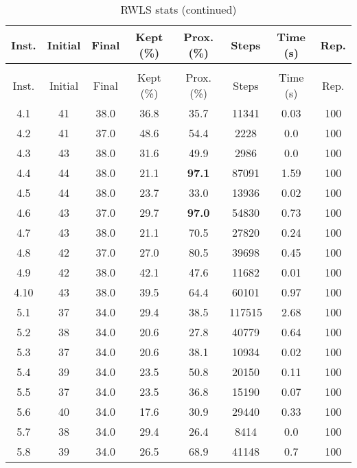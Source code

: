 \begin{longtable}{@{\extracolsep{5pt}}cccccccc}
	\caption{RWLS stats}\\
	\toprule
	Inst. & Initial & Final & Kept (\%) & Prox. (\%) & Steps & Time (s) & Rep.\\
	\midrule
	\endfirsthead
	\caption[]{RWLS stats (continued)}\\
	\toprule
	Inst. & Initial & Final & Kept (\%) & Prox. (\%) & Steps & Time (s) & Rep.\\
	\midrule
	\endhead
	\bottomrule
	\endfoot
	4.1 &
		41 & 38.0 &
			36.8
		&
			35.7
		& 11341 & 0.03 & 100
	\\
	4.2 &
		41 & 37.0 &
			48.6
		&
			54.4
		& 2228 & 0.0 & 100
	\\
	4.3 &
		43 & 38.0 &
			31.6
		&
			49.9
		& 2986 & 0.0 & 100
	\\
	4.4 &
		44 & 38.0 &
			21.1
		&
			\textbf{97.1}
		& 87091 & 1.59 & 100
	\\
	4.5 &
		44 & 38.0 &
			23.7
		&
			33.0
		& 13936 & 0.02 & 100
	\\
	4.6 &
		43 & 37.0 &
			29.7
		&
			\textbf{97.0}
		& 54830 & 0.73 & 100
	\\
	4.7 &
		43 & 38.0 &
			21.1
		&
			70.5
		& 27820 & 0.24 & 100
	\\
	4.8 &
		42 & 37.0 &
			27.0
		&
			80.5
		& 39698 & 0.45 & 100
	\\
	4.9 &
		42 & 38.0 &
			42.1
		&
			47.6
		& 11682 & 0.01 & 100
	\\
	4.10 &
		43 & 38.0 &
			39.5
		&
			64.4
		& 60101 & 0.97 & 100
	\\
	5.1 &
		37 & 34.0 &
			29.4
		&
			38.5
		& 117515 & 2.68 & 100
	\\
	5.2 &
		38 & 34.0 &
			20.6
		&
			27.8
		& 40779 & 0.64 & 100
	\\
	5.3 &
		37 & 34.0 &
			20.6
		&
			38.1
		& 10934 & 0.02 & 100
	\\
	5.4 &
		39 & 34.0 &
			23.5
		&
			50.8
		& 20150 & 0.11 & 100
	\\
	5.5 &
		37 & 34.0 &
			23.5
		&
			36.8
		& 15190 & 0.07 & 100
	\\
	5.6 &
		40 & 34.0 &
			17.6
		&
			30.9
		& 29440 & 0.33 & 100
	\\
	5.7 &
		38 & 34.0 &
			29.4
		&
			26.4
		& 8414 & 0.0 & 100
	\\
	5.8 &
		39 & 34.0 &
			26.5
		&
			68.9
		& 41148 & 0.7 & 100
	\\

\end{longtable}
